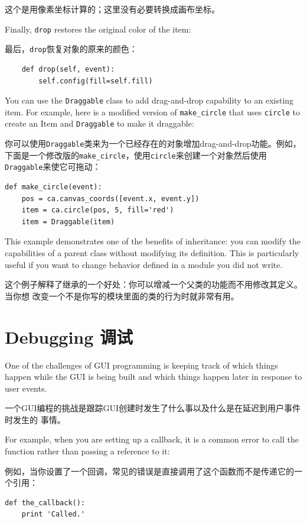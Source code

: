 \documentclass[10pt]{book}
\begin{document}
\begin{CJK}{UTF8}{gbsn}
这个是用像素坐标计算的；这里没有必要转换成画布坐标。

Finally, {\tt drop} restores the original color of the item:

最后，{\tt drop}恢复对象的原来的颜色：

\begin{verbatim}
    def drop(self, event):
        self.config(fill=self.fill)
\end{verbatim}
%
You can use the {\tt Draggable} class to add drag-and-drop
capability to an existing item.  For example, here is a modified
version of \verb"make_circle" that uses {\tt circle} to create
an Item and {\tt Draggable} to make it draggable:

你可以使用{\tt Draggable}类来为一个已经存在的对象增加drag-and-drop功能。例如，
下面是一个修改版的\verb"make_circle"，使用{\tt circle}来创建一个对象然后使用
{\tt Draggable}来使它可拖动：

\begin{verbatim}
def make_circle(event):
    pos = ca.canvas_coords([event.x, event.y])
    item = ca.circle(pos, 5, fill='red')
    item = Draggable(item)
\end{verbatim}
%
This example demonstrates one of the benefits of inheritance: you can
modify the capabilities of a parent class without modifying its
definition.  This is particularly useful if you want to change
behavior defined in a module you did not write.

这个例子解释了继承的一个好处：你可以增减一个父类的功能而不用修改其定义。当你想
改变一个不是你写的模块里面的类的行为时就非常有用。


\section{Debugging 调试}

One of the challenges of GUI programming is keeping track of
which things happen while the GUI is being built and which
things happen later in response to user events.

一个GUI编程的挑战是跟踪GUI创建时发生了什么事以及什么是在延迟到用户事件时发生的
事情。

For example, when you are setting up a callback, it is a common error
to call the function rather than passing a reference to it:

例如，当你设置了一个回调，常见的错误是直接调用了这个函数而不是传递它的一个引用：

\begin{verbatim}
def the_callback():
    print 'Called.'


\end{verbatim}
\end{CJK}
\end{document}
